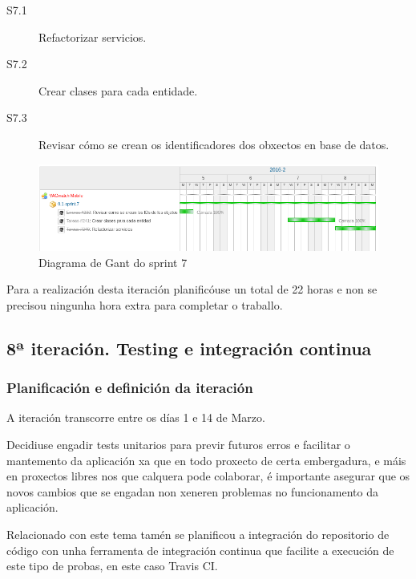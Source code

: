         \begin{description}
         \item [S7.1] Refactorizar servicios.
         \item [S7.2] Crear clases para cada entidade.
         \item [S7.3] Revisar cómo se crean os identificadores dos obxectos en 
base de datos.
        \end{description}

        \begin{figure}[h!]
          \begin{center}
          \includegraphics[width=\textwidth]{./img/gant_diagrams/07.png}
          \caption{Diagrama de Gant do sprint 7}
          \label{fig:gant07}
          \end{center}
        \end{figure}

    Para a realización desta iteración planificóuse un total de 22 horas e 
non se precisou ningunha hora extra para completar o traballo.

    \subsection{8ª iteración. Testing e integración continua}

      \subsubsection{Planificación e definición da iteración}
      A iteración transcorre entre os días 1 e 14 de Marzo.

      Decidiuse engadir tests unitarios para previr futuros erros e facilitar o 
mantemento da aplicación xa que en todo proxecto de certa embergadura, e máis 
en proxectos libres nos que calquera pode colaborar, é importante asegurar que 
os novos cambios que se engadan non xeneren problemas no funcionamento da 
aplicación.

      Relacionado con este tema tamén se planificou a integración do 
repositorio de código con unha ferramenta de integración continua que facilite 
a execución de este tipo de probas, en este caso Travis CI.

